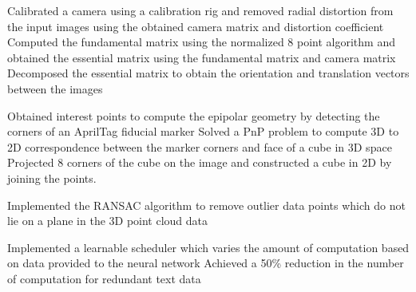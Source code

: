 \resumeItemListStart
\resumeItemDesc
{Calibrated a camera using a calibration rig and removed radial distortion from the input images using the obtained camera matrix and distortion coefficient}
\resumeItemDesc
{Computed the fundamental matrix using the normalized 8 point algorithm and obtained the essential matrix using the fundamental matrix and camera matrix}
\resumeItemDesc
{Decomposed the essential matrix to obtain the orientation and translation vectors between the images}
\resumeItemListEnd

\resumeItemListStart
\resumeItemDesc
{Obtained interest points to compute the epipolar geometry by detecting the corners of an AprilTag fiducial marker}
\resumeItemDesc
{Solved a PnP problem to compute 3D to 2D correspondence between the marker corners and face of a cube in 3D space}
\resumeItemDesc
{Projected 8 corners of the cube on the image and constructed a cube in 2D by joining the points. }
\resumeItemListEnd

\resumeItemListStart
\resumeItemDesc
{Implemented the RANSAC algorithm to remove outlier data points which do not lie on a plane in the 3D point cloud data}
\resumeItemListEnd

\resumeItemListStart
{}
\resumeItemDesc
{Implemented a learnable scheduler which varies the amount of computation based on data provided to the neural network}
\resumeItemDesc
{Achieved a 50\% reduction in the number of computation for redundant text data}
\resumeItemListEnd

\resumeItemListStart
{}
\resumeItemListEnd

